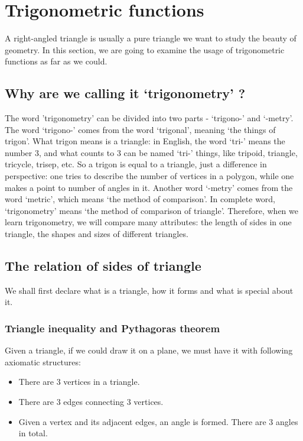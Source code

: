 \documentclass[12pt]{article}
\begin{document}
    \newpage

    \section{Trigonometric functions}

    A right-angled triangle is usually a pure triangle we want to study the beauty of geometry. In this section, we are going to examine the usage of trigonometric functions as far as we could.

    \subsection{Why are we calling it `trigonometry' ?}

    The word 'trigonometry' can be divided into two parts - `trigono-' and `-metry'. The word `trigono-' comes from the word `trigonal', meaning `the things of trigon'. What trigon means is a triangle: in English, the word `tri-' means the number 3, and what counts to 3 can be named `tri-' things, like tripoid, triangle, tricycle, trisep, etc. So a trigon is equal to a triangle, just a difference in perspective: one tries to describe the number of vertices in a polygon, while one makes a point to number of angles in it. Another word `-metry' comes from the word `metric', which means `the method of comparison'. In complete word, `trigonometry' means `the method of comparison of triangle'. Therefore, when we learn trigonometry, we will compare many attributes: the length of sides in one triangle, the shapes and sizes of different triangles.

    \subsection{The relation of sides of triangle}

    We shall first declare what is a triangle, how it forms and what is special about it.

    \subsubsection{Triangle inequality and Pythagoras theorem}

    Given a triangle, if we could draw it on a plane, we must have it with following axiomatic structures:\begin{itemize}
        \item There are 3 vertices in a triangle.
        \item There are 3 edges connecting 3 vertices.
        \item Given a vertex and its adjacent edges, an angle is formed. There are 3 angles in total.
    \end{itemize}
\end{document}
